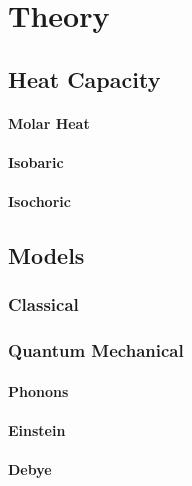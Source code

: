 \section[Theory]{Theory \textnormal{\cite{GrossMarx+2022}}}
\label{sec:theory}

\subsection{Heat Capacity}

\paragraph{Molar Heat}

\paragraph{Isobaric}

\paragraph{Isochoric}

\subsection{Models}

\subsubsection{Classical}

\subsubsection{Quantum Mechanical}

\paragraph{Phonons}

\paragraph{Einstein}

\paragraph{Debye}

